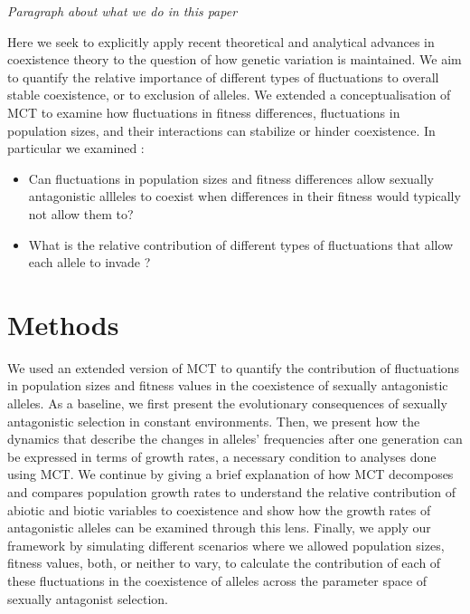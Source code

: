 \documentclass[12pt]{article}
\begin{document}
\textit{Paragraph about what we do in this paper}


Here we seek to explicitly apply recent theoretical and analytical advances in coexistence theory to the question of how genetic variation is maintained. We aim to quantify the relative importance of different types of fluctuations to overall stable coexistence, or to exclusion of alleles. We extended a conceptualisation of MCT \citep{ellner2016quantify,ellner_expanded_2019} to examine how fluctuations in fitness differences, fluctuations in population sizes, and their interactions can stabilize or hinder coexistence. In particular we examined :

\begin{itemize}
	\item Can fluctuations in population sizes and fitness differences allow sexually antagonistic allleles to coexist when differences in their fitness would typically not allow them to?
	\item What is the relative contribution of different types of fluctuations that allow each allele to invade ?
\end{itemize}

\clearpage
\section{Methods}

We used an extended version of MCT to quantify the contribution of fluctuations in population sizes and fitness values in the coexistence of sexually antagonistic alleles. As a baseline, we first present the evolutionary consequences of sexually antagonistic selection in constant environments. Then, we present how the dynamics that describe the changes in alleles' frequencies after one generation can be expressed in terms of growth rates, a necessary condition to analyses done using MCT. We continue by giving a brief explanation of how MCT decomposes and compares population growth rates to understand the relative contribution of abiotic and biotic variables to coexistence and show how the growth rates of antagonistic alleles can be examined through this lens. Finally, we apply our framework by simulating different scenarios where we allowed population sizes, fitness values, both, or neither to vary, to calculate the contribution of each of these fluctuations in the coexistence of alleles across the parameter space of sexually antagonist selection.
\end{document}
